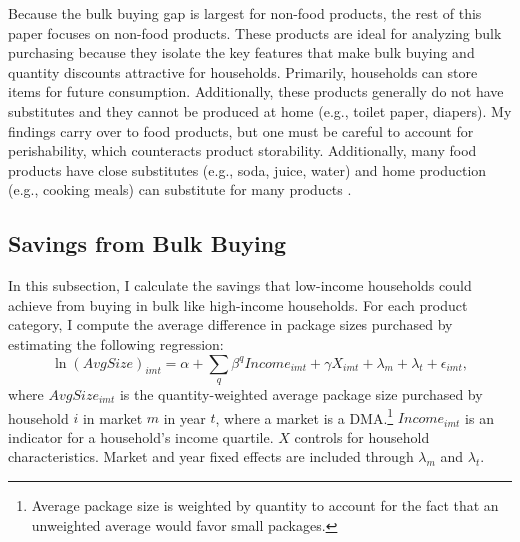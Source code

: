 \documentclass[AER]{AEA_mal}
\begin{document}
Because the bulk buying gap is largest for non-food products, the rest of this paper focuses on non-food products. These products are ideal for analyzing bulk purchasing because they isolate the key features that make bulk buying and quantity discounts attractive for households. Primarily, households can store items for future consumption. Additionally, these products generally do not have substitutes and they cannot be produced at home (e.g., toilet paper, diapers). My findings carry over to food products, but one must be careful to account for perishability, which counteracts product storability. Additionally, many food products have close substitutes (e.g., soda, juice, water) and home production (e.g., cooking meals) can substitute for many products \citep{aguiar2005, aguiar2007aer}.

\subsection{Savings from Bulk Buying}

In this subsection, I calculate the savings that low-income households could achieve from buying in bulk like high-income households. For each product category, I compute the average difference in package sizes purchased by estimating the following regression:
\begin{equation}
\label{eq:discountingBehavior2}
\ln({AvgSize})_{imt} = \alpha + \sum_q \beta^q Income_{imt} + \gamma X_{imt} + \lambda_m + \lambda_t + \epsilon_{imt},
\end{equation}
where $AvgSize_{imt}$ is the quantity-weighted average package size purchased by household $i$ in market $m$ in year $t$, where a market is a DMA.\footnote{Average package size is weighted by quantity to account for the fact that an unweighted average would favor small packages.} $Income_{imt}$ is an indicator for a household's income quartile. $X$ controls for household characteristics. Market and year fixed effects are included through $\lambda_m$ and $\lambda_t$.
\end{document}
